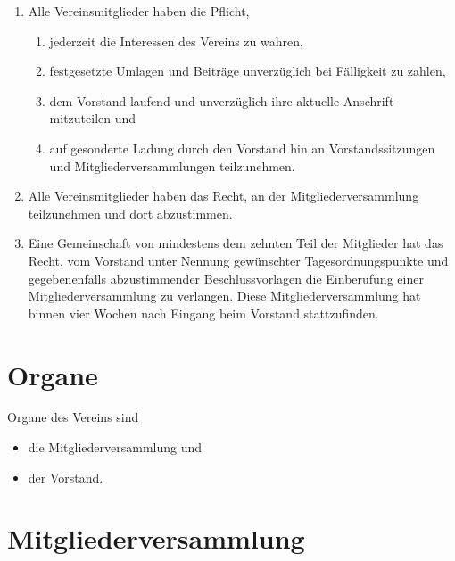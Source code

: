 \documentclass[a4paper, 10pt, headings=normal]{scrartcl}
\begin{document}
\begin{multicols}{2}
\begin{enumerate}[label={(\arabic*)}]
	\item
		Alle Vereinsmitglieder haben die Pflicht,
		\begin{enumerate}[label={\arabic*.}]
			\item
				jederzeit die Interessen des Vereins zu wahren,
			\item
				festgesetzte Umlagen und Beiträge unverzüglich bei Fälligkeit zu zahlen,
			\item
				dem Vorstand laufend und unverzüglich ihre aktuelle Anschrift mitzuteilen und
			\item
				auf gesonderte Ladung durch den Vorstand hin an Vorstandssitzungen und Mitgliederversammlungen teilzunehmen.
		\end{enumerate}
	\item
		Alle Vereinsmitglieder haben das Recht, an der Mitgliederversammlung teilzunehmen und dort abzustimmen.
	\item
		Eine Gemeinschaft von mindestens dem zehnten Teil der Mitglieder hat das Recht, vom Vorstand unter Nennung gewünschter Tagesordnungspunkte und gegebenenfalls abzustimmender Beschlussvorlagen die Einberufung einer Mitgliederversammlung zu verlangen.
		Diese Mitgliederversammlung hat binnen vier Wochen nach Eingang beim Vorstand stattzufinden.
\end{enumerate}

\section{Organe}
\label{par:organe}

Organe des Vereins sind
\begin{itemize}[label={–}]
	\item
		die Mitgliederversammlung und
	\item
		der Vorstand.
\end{itemize}

\section{Mitgliederversammlung}
\label{par:mitgliederversammlung}


\end{multicols}
\end{document}
